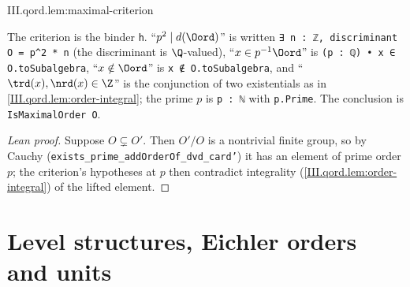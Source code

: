 \begin{lemma}
\end{lemma}
\begin{tfformal}{III.qord.lem:maximal-criterion}
\begin{tffidelity}
The criterion is the binder \texttt{h}. ``$p^2\mid d(\Oord)$'' is written \texttt{∃ n : ℤ, discriminant O = p\^{}2 * n} (the discriminant is $\Q$-valued), ``$x\in p^{-1}\Oord$'' is \texttt{(p : ℚ) • x ∈ O.toSubalgebra}, ``$x\notin\Oord$'' is \texttt{x ∉ O.toSubalgebra}, and ``$\trd(x),\nrd(x)\in\Z$'' is the conjunction of two existentials as in \cref{III.qord.lem:order-integral}; the prime $p$ is \texttt{p : ℕ} with \texttt{p.Prime}. The conclusion is \texttt{IsMaximalOrder O}.
\end{tffidelity}
\end{tfformal}
\begin{proof}[Lean proof]
Suppose $O\subsetneq O'$. Then $O'/O$ is a nontrivial finite group, so by Cauchy (\texttt{exists\_prime\_addOrderOf\_dvd\_card'}) it has an element of prime order $p$; the criterion's hypotheses at $p$ then contradict integrality (\cref{III.qord.lem:order-integral}) of the lifted element.
\end{proof}


\section{Level structures, Eichler orders and units}\label{sec:qord-eichler}

